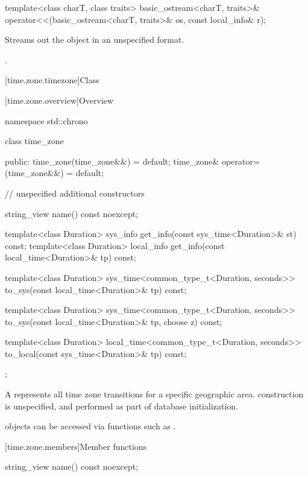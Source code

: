 %
\begin{itemdecl}
template<class charT, class traits>
  basic_ostream<charT, traits>&
    operator<<(basic_ostream<charT, traits>& os, const local_info& r);
\end{itemdecl}

\begin{itemdescr}
\pnum
\effects
Streams out the  object  in an unspecified format.

\pnum
\returns
{}.
\end{itemdescr}

[time.zone.timezone]{Class }

[time.zone.overview]{Overview}

\begin{codeblock}
namespace std::chrono {
  class time_zone {
  public:
    time_zone(time_zone&&) = default;
    time_zone& operator=(time_zone&&) = default;

    // unspecified additional constructors

    string_view name() const noexcept;

    template<class Duration> sys_info   get_info(const sys_time<Duration>& st)   const;
    template<class Duration> local_info get_info(const local_time<Duration>& tp) const;

    template<class Duration>
      sys_time<common_type_t<Duration, seconds>>
        to_sys(const local_time<Duration>& tp) const;

    template<class Duration>
      sys_time<common_type_t<Duration, seconds>>
        to_sys(const local_time<Duration>& tp, choose z) const;

    template<class Duration>
      local_time<common_type_t<Duration, seconds>>
        to_local(const sys_time<Duration>& tp) const;
  };
}
\end{codeblock}

\pnum
A  represents all time zone transitions
for a specific geographic area.
 construction is unspecified,
and performed as part of database initialization.
\begin{note}
 objects can be accessed
via functions such as .
\end{note}

[time.zone.members]{Member functions}

%
\begin{itemdecl}
string_view name() const noexcept;
\end{itemdecl}

